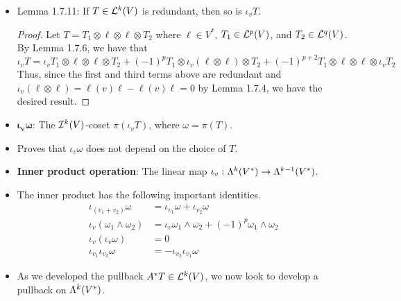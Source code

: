 \documentclass[../notes.tex]{subfiles}
\begin{document}
\begin{itemize}
\begin{proof}
        \begin{align*}
            0 &= \iota_v\iota_v\tag*{Lemma 1.7.8}\\
            &= (\iota_{v_1}+\iota_{v_2})(\iota_{v_1}+\iota_{v_2})\\
            &= \iota_{v_1}\iota_{v_1}+\iota_{v_1}\iota_{v_2}+\iota_{v_2}\iota_{v_1}+\iota_{v_2}\iota_{v_2}\\
            &= \iota_{v_1}\iota_{v_2}+\iota_{v_2}\iota_{v_1}\tag*{Lemma 1.7.8}
        \end{align*}
        yielding the desired result.
    \end{proof}
    \item Lemma 1.7.11: If $T\in\lin[k]{V}$ is redundant, then so is $\iota_vT$.
    \begin{proof}
        Let $T=T_1\otimes\ell\otimes\ell\otimes T_2$ where $\ell\in V^*$, $T_1\in\lin[p]{V}$, and $T_2\in\lin[q]{V}$. By Lemma 1.7.6, we have that
        \begin{equation*}
            \iota_vT = \iota_vT_1\otimes\ell\otimes\ell\otimes T_2+(-1)^pT_1\otimes\iota_v(\ell\otimes\ell)\otimes T_2+(-1)^{p+2}T_1\otimes\ell\otimes\ell\otimes\iota_vT_2
        \end{equation*}
        Thus, since the first and third terms above are redundant and $\iota_v(\ell\otimes\ell)=\ell(v)\ell-\ell(v)\ell=0$ by Lemma 1.7.4, we have the desired result.
    \end{proof}
    \item $\bm{\iota_v\omega}$: The $\ide[k]{V}$-coset $\pi(\iota_vT)$, where $\omega=\pi(T)$.
    \item Proves that $\iota_v\omega$ does not depend on the choice of $T$.
    \item \textbf{Inner product operation}: The linear map $\iota_v:\lam[k]{V^*}\to\lam[k-1]{V^*}$.
    \item The inner product has the following important identities.
    \begin{align*}
        \iota_{(v_1+v_2)}\omega &= \iota_{v_1}\omega+\iota_{v_2}\omega\\
        \iota_v(\omega_1\wedge\omega_2) &= \iota_v\omega_1\wedge\omega_2+(-1)^p\omega_1\wedge\omega_2\\
        \iota_v(\iota_v\omega) &= 0\\
        \iota_{v_1}\iota_{v_2}\omega &= -\iota_{v_2}\iota_{v_1}\omega
    \end{align*}
    \item {}As we developed the pullback $A^*T\in\lin[k]{V}$, we now look to develop a pullback on $\lam[k]{V^*}$.

\end{itemize}
\end{document}
